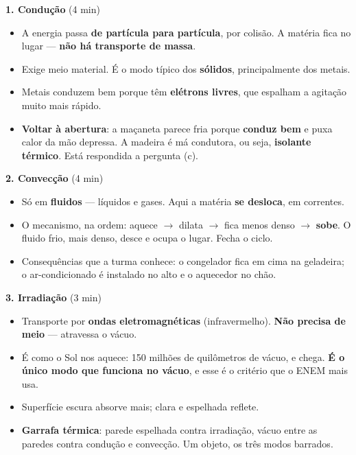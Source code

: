 \documentclass[11pt,a4paper]{article}
\begin{document}
\begin{quadro}
\textbf{1. Condu\c{c}\~ao} (4 min)
\begin{itemize}[nosep]
  \item A energia passa \textbf{de part\'icula para part\'icula}, por
        colis\~ao. A mat\'eria fica no lugar --- \textbf{n\~ao h\'a transporte
        de massa}.
  \item Exige meio material. \'E o modo t\'ipico dos \textbf{s\'olidos},
        principalmente dos metais.
  \item Metais conduzem bem porque t\^em \textbf{el\'etrons livres}, que
        espalham a agita\c{c}\~ao muito mais r\'apido.
  \item \textbf{Voltar \`a abertura}: a ma\c{c}aneta parece fria porque
        \textbf{conduz bem} e puxa calor da m\~ao depressa. A madeira \'e m\'a
        condutora, ou seja, \textbf{isolante t\'ermico}. Est\'a respondida a
        pergunta (c).
\end{itemize}

\medskip
\textbf{2. Convec\c{c}\~ao} (4 min)
\begin{itemize}[nosep]
  \item S\'o em \textbf{fluidos} --- l\'iquidos e gases. Aqui a mat\'eria
        \textbf{se desloca}, em correntes.
  \item O mecanismo, na ordem: aquece $\rightarrow$ dilata
        $\rightarrow$ fica menos denso $\rightarrow$ \textbf{sobe}. O
        fluido frio, mais denso, desce e ocupa o lugar. Fecha o ciclo.
  \item Consequ\^encias que a turma conhece: o congelador fica em cima na
        geladeira; o ar-condicionado \'e instalado no alto e o aquecedor
        no ch\~ao.
\end{itemize}

\medskip
\textbf{3. Irradia\c{c}\~ao} (3 min)
\begin{itemize}[nosep]
  \item Transporte por \textbf{ondas eletromagn\'eticas}
        (infravermelho). \textbf{N\~ao precisa de meio} --- atravessa o
        v\'acuo.
  \item \'E como o Sol nos aquece: 150 milh\~oes de quil\^ometros de v\'acuo, e
        chega. \textbf{\'E o \'unico modo que funciona no v\'acuo}, e esse \'e
        o crit\'erio que o ENEM mais usa.
  \item Superf\'icie escura absorve mais; clara e espelhada reflete.
  \item \textbf{Garrafa t\'ermica}: parede espelhada contra irradia\c{c}\~ao,
        v\'acuo entre as paredes contra condu\c{c}\~ao e convec\c{c}\~ao. Um objeto,
        os tr\^es modos barrados.
\end{itemize}


\end{quadro}
\end{document}
